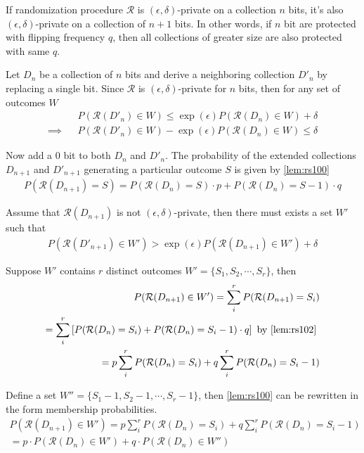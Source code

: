 \documentclass[11pt]{article}
\newcommand{\cR}{\mathcal{R}}
\begin{document}
\begin{lem} \label{lem:rs2}
If randomization procedure $\cR$ is $(\epsilon, \delta)$-private on a collection $n$ bits, it's also $(\epsilon, \delta)$-private on a collection of $n+1$ bits.  In other words, if $n$ bit are protected with flipping frequency $q$, then all collections of greater size are also protected with same $q$. 
\end{lem}
\begin{pf}
Let $D_n$ be a collection of $n$ bits and derive a neighboring collection $D'_n$ by replacing a single bit.  Since $\cR$ is $(\epsilon, \delta)$-private for $n$ bits, then for any set of outcomes $W$
\begin{align}\label{lem:rs101}
 && P(\cR(D'_n) \in W) \le \exp(\epsilon)P(\cR(D_n) \in W) + \delta \\
 \implies && P(\cR(D'_n) \in W) - \exp(\epsilon)P(\cR(D_n) \in W) \le \delta
\end{align}
 
 Now add a 0 bit to both $D_n$ and $D'_n$.  The probability of the extended collections $D_{n+1}$ and $D'_{n+1}$ generating a particular outcome $S$ is given by  \eqref{lem:rs100}
 \begin{align}\label{lem:rs102}
P(\cR(D_{n+1}) = S) = P(\cR(D_n)=S) \cdot p + P(\cR(D_n)=S-1) \cdot q
\end{align}

Assume that $\cR(D_{n+1})$ is not $(\epsilon, \delta)$-private, then there must exists a set $W'$ such that 
\begin{align}\label{lem:rs103}
P(\cR(D'_{n+1}) \in W') > \exp(\epsilon)P(\cR(D_{n+1}) \in W') + \delta
\end{align}
 
Suppose $W'$ contains $r$ distinct outcomes $W'=\{S_1, S_2, \cdots, S_r\}$, then
\begin{align}
P(\cR(D_{n+1}) \in W') = \sum_i^r P( \cR(D_{n+1})  = S_i) \\
=  \sum_i^r \left [ P( \cR(D_{n})  = S_i) + P(\cR(D_n)=S_i-1) \cdot q \right ]  \text{ by  \eqref{lem:rs102} } \\
= p \sum_i^r P( \cR(D_{n})  = S_i)  + q \sum_i^r  P( \cR(D_{n})  = S_i - 1)  \label{lem:rs103}
\end{align}
 
 Define a set $W'' = \{S_1 - 1, S_2 - 1, \cdots, S_r - 1\}$, then \eqref{lem:rs100} can be rewritten in the form membership probabilities.  
 \begin{align}
P(\cR(D_{n+1}) \in W') = p \sum_i^r P( \cR(D_{n})  = S_i)  + q \sum_i^r  P( \cR(D_{n})  = S_i - 1) \\
= p \cdot P(\cR(D_n) \in W') + q \cdot P(\cR(D_n) \in W'')
\end{align}


\end{pf}
\end{document}
